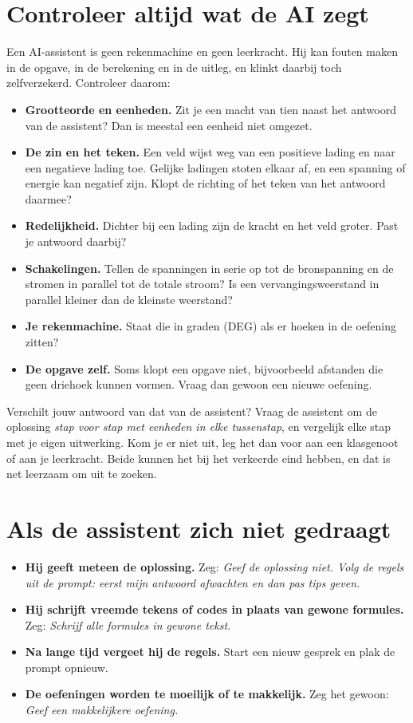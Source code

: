 \documentclass{ximera}
\begin{document}
\section{Controleer altijd wat de AI zegt}\label{sec:ai-controle}
Een AI-assistent is geen rekenmachine en geen leerkracht. Hij kan fouten maken in de opgave, in de berekening en in de uitleg, en klinkt daarbij toch zelfverzekerd. Controleer daarom:
\begin{itemize}
    \item \textbf{Grootteorde en eenheden.} Zit je een macht van tien naast het antwoord van de assistent? Dan is meestal een eenheid niet omgezet.
    \item \textbf{De zin en het teken.} Een veld wijst weg van een positieve lading en naar een negatieve lading toe. Gelijke ladingen stoten elkaar af, en een spanning of energie kan negatief zijn. Klopt de richting of het teken van het antwoord daarmee?
    \item \textbf{Redelijkheid.} Dichter bij een lading zijn de kracht en het veld groter. Past je antwoord daarbij?
    \item \textbf{Schakelingen.} Tellen de spanningen in serie op tot de bronspanning en de stromen in parallel tot de totale stroom? Is een vervangingsweerstand in parallel kleiner dan de kleinste weerstand?
    \item \textbf{Je rekenmachine.} Staat die in graden (DEG) als er hoeken in de oefening zitten?
    \item \textbf{De opgave zelf.} Soms klopt een opgave niet, bijvoorbeeld afstanden die geen driehoek kunnen vormen. Vraag dan gewoon een nieuwe oefening.
\end{itemize}
Verschilt jouw antwoord van dat van de assistent? Vraag de assistent om de oplossing \emph{stap voor stap met eenheden in elke tussenstap}, en vergelijk elke stap met je eigen uitwerking. Kom je er niet uit, leg het dan voor aan een klasgenoot of aan je leerkracht. Beide kunnen het bij het verkeerde eind hebben, en dat is net leerzaam om uit te zoeken.

\section{Als de assistent zich niet gedraagt}\label{sec:ai-problemen}
\begin{itemize}
    \item \textbf{Hij geeft meteen de oplossing.} Zeg: \emph{Geef de oplossing niet. Volg de regels uit de prompt: eerst mijn antwoord afwachten en dan pas tips geven.}
    \item \textbf{Hij schrijft vreemde tekens of codes in plaats van gewone formules.} Zeg: \emph{Schrijf alle formules in gewone tekst.}
    \item \textbf{Na lange tijd vergeet hij de regels.} Start een nieuw gesprek en plak de prompt opnieuw.
    \item \textbf{De oefeningen worden te moeilijk of te makkelijk.} Zeg het gewoon: \emph{Geef een makkelijkere oefening.}
\end{itemize}
\end{document}
